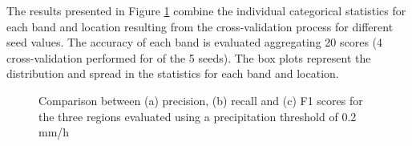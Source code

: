 \documentclass[3p,times]{elsarticle}
\begin{document}
The results presented in Figure \ref{experiment_1a} combine the individual categorical statistics for each band and location resulting from the cross-validation process for different seed values. The accuracy of each band is evaluated aggregating 20 scores (4 cross-validation performed for of the 5 seeds). The box plots represent the distribution and spread in the statistics for each band and location. %

\begin{figure}%
    \centering
    \quad
    
    \caption{Comparison between (a) precision, (b) recall and (c) F1 scores for the three regions evaluated using a precipitation threshold of 0.2 mm/h}%
    \label{experiment_1a}%
\end{figure}
\end{document}

